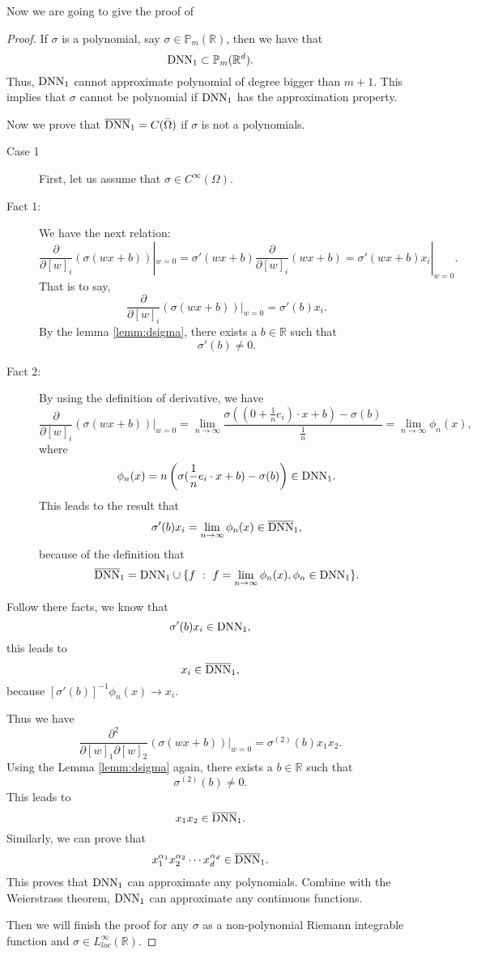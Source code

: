 Now we are going to give the proof of 
\begin{proof}
	If $\sigma$ is a polynomial, say $\sigma \in \mathbb{P}_m(\mathbb{R})$, then we have that
	$$
	{\rm DNN}_1 \subset \mathbb{P}_m(\mathbb{R}^d).
	$$
	Thus, ${\rm DNN}_1$ cannot approximate polynomial of degree bigger than $m+1$. This implies that $\sigma$ cannot be polynomial if ${\rm DNN}_1$ has the approximation property.
	
	Now we prove that $\overline{\rm DNN}_1 = C(\bar \Omega)$ if $\sigma$ is not a polynomials.
	
	\begin{description}
		\item[Case 1] First, let us assume that $\sigma \in C^{\infty}(\Omega)$. 
		
		\item[Fact 1:] We have the next relation:
		$$
		\frac{\partial}{\partial [w]_i} \left(\sigma(wx + b) \right) |_{w=0}= \sigma'(wx+b)\frac{\partial}{\partial [w]_i} (wx+b) = \sigma'(wx+b)x_i |_{w=0}.
		$$
		That is to say,
		$$
		\frac{\partial}{\partial [w]_i} \left(\sigma(wx + b) \right) |_{w=0} = \sigma'(b)x_i.
		$$
		By the lemma \ref{lemm:dsigma}, there exists a $b \in \mathbb{R}$ such that 
		$$
		\sigma'(b) \neq 0.
		$$
		\item[Fact 2:] By using the definition of derivative, we have
		$$
		\frac{\partial}{\partial [w]_i} \left(\sigma(wx + b) \right) |_{w=0}=
		\lim_{n\to \infty} \frac{\sigma((0 + \frac{1}{n}e_i )\cdot x + b) - \sigma(b)}{\frac{1}{n}} = \lim_{n\to\infty} \phi_n(x),
		$$
		where 
		$$
		\phi_n(x) = n \left(\sigma(\frac{1}{n}e_i \cdot x + b) - \sigma(b)\right) \in {\rm DNN}_1.
		$$
		This leads to the result that
		$$
		\sigma'(b)x_i = \lim_{n\to\infty} \phi_n(x) \in \overline{\rm DNN}_1,
		$$
		because of the definition that
		$$
		\overline{\rm DNN}_1 = {\rm DNN}_1 \cup \{f ~:~f = \lim_{n\to\infty} \phi_n(x), \phi_n \in {\rm DNN}_1 \}. 
		$$
	\end{description}
	Follow there facts, we know that
	$$
	\sigma'(b)x_i \in {\rm DNN}_1,
	$$
	this leads to 
	$$
	x_i \in 	\overline{\rm DNN}_1,
	$$
	because  $[\sigma'(b)]^{-1} \phi_n(x) \to x_i$.
	
	Thus we have
	$$
	\frac{\partial^2}{\partial [w]_1 \partial [w]_2} \left(\sigma(wx+b)\right) |_{w=0} = \sigma^{(2)}(b)x_1x_2.
	$$
	Using the Lemma \ref{lemm:dsigma} again, there exists a $b \in \mathbb{R}$ such that
	$$
	\sigma^{(2)}(b) \neq 0.
	$$
	This leads to 
	$$
	x_1x_2 \in \overline{\rm DNN}_1 .
	$$
	Similarly, we can prove that
	$$
	x_1^{\alpha_1} x_2^{\alpha_2} \cdots x_d^{\alpha_d} \in \overline{\rm DNN}_1.
	$$
	This proves that ${\rm DNN}_1$ can approximate any polynomials.
	Combine with the Weierstrass theorem, ${\rm DNN}_1$ can approximate any continuous functions.
	
	Then we will finish the proof for any $\sigma$ as a non-polynomial Riemann integrable function and $\sigma\in L_{loc}^\infty(\mathbb{R})$.
\end{proof}

